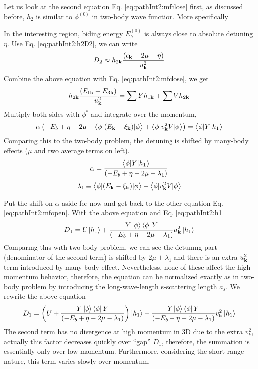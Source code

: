 Let us look at the second equation Eq. \ref{eq:pathInt2:mfclose} first, as discussed before, $h_{2}$ is similar to $\phi^{(0)}$ in two-body wave function. More specifically

In the interesting region, biding energy $E_{b}^{(0)}$ is always close to absolute detuning $\eta$.   
Use Eq. \ref{eq:pathInt2:h2D2}, we can write 
\begin{equation*}
D_{2}\approx{}h_{2\mathbf{k}}\frac{(\epsilon_{\mathbf{k}}-2\mu+\eta)}{u_{\mathbf{k}}^{2}}
\end{equation*}
Combine the above equation with Eq. \ref{eq:pathInt2:mfclose}, we get 
\begin{equation*}
h_{2\mathbf{k}}\frac{(E_{1\mathbf{k}}+E_{3\mathbf{k}})}{u_{\mathbf{k}}^{2}}=\sum{}Yh_{1\mathbf{k}}+\sum{}Vh_{2\mathbf{k}}
\end{equation*}
Multiply both sides with $\phi^{*}$ and integrate over the momentum,
\begin{equation}
\alpha\left(-E_{b}+\eta-2\mu-\bigl<{\phi{\lvert{(E_{\ensuremath{\mathbf{k}}}-\xi_{\ensuremath{\mathbf{k}}})}\rvert}\phi}\bigr>+\bigl<{\phi{\lvert{v_{\ensuremath{\mathbf{k}}}^{2}V}\rvert}\phi}\bigr>\right)=\bigl<{\phi{\lvert{Y}\rvert}h_{1}}\bigr>
\end{equation}
Comparing this to the two-body problem, the detuning is shifted by many-body effects ($\mu$ and two average terms on left).  
\begin{equation}\label{eq:pathInt2:alpha}
\alpha=\frac{\bigl<{\phi{\lvert{Y}\rvert}h_{1}}\bigr>}{\left(-E_{b}+\eta-2\mu-\lambda_{1}\right)}
\end{equation}
\begin{equation}\label{eq:pathInt2:lambda1}
\lambda_{1}\equiv\bigl<{\phi{\lvert{(E_{\ensuremath{\mathbf{k}}}-\xi_{\ensuremath{\mathbf{k}}})}\rvert}\phi}\bigr>-\bigl<{\phi{\lvert{v_{\ensuremath{\mathbf{k}}}^{2}V}\rvert}\phi}\bigr>
\end{equation}

Put the shift on $\alpha$ aside for now and get back to the other equation Eq. \ref{eq:pathInt2:mfopen}.  With the above equation and Eq. \ref{eq:pathInt2:h1}
\begin{equation*}
D_{1}=U\left|h_{1}\right>+\frac{Y\left|\phi\right>\left<\phi\right|{Y}}{\left(-E_{b}+\eta-2\mu-\lambda_{1}\right)}u_{\mathbf{k}}^{2}\left|{h_{1}}\right>
\end{equation*}
Comparing this with two-body problem, we can see the detuning part (denominator of the second term) is shifted by $2\mu+\lambda_{1}$ and there is an extra $u_{\mathbf{k}}^{2}$ term introduced by many-body effect.  Nevertheless, none of these affect the high-momentum behavior, therefore, the equation can be normalized exactly as in two-body problem by introducing the long-wave-length s-scattering length $a_{s}$.  We rewrite the above equation
\begin{equation*}
D_{1}=\left(U+\frac{Y\left|\phi\right>\left<\phi\right|{Y}}{\left(-E_{b}+\eta-2\mu-\lambda_{1}\right)}\right)\left|{h_{1}}\right>
	-\frac{Y\left|\phi\right>\left<\phi\right|{Y}}{\left(-E_{b}+\eta-2\mu-\lambda_{1}\right)}v_{\mathbf{k}}^{2}\left|{h_{1}}\right>
\end{equation*}
The second term has no divergence at high momentum in 3D due to the extra $v_{k}^{2}$, actually this factor decreases quickly over ``gap'' $D_{1}$, therefore, the summation is essentially only over low-momentum.   Furthermore, considering the short-range nature, this term varies slowly over momentum.  

